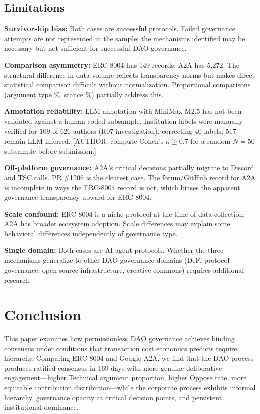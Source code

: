 \documentclass[conference]{IEEEtran}
\begin{document}
\subsection{Limitations}

\textbf{Survivorship bias:} Both cases are successful protocols. Failed
governance attempts are not represented in the sample; the mechanisms
identified may be necessary but not sufficient for successful DAO governance.

\textbf{Comparison asymmetry:} ERC-8004 has 149 records; A2A has 5,272.
The structural difference in data volume reflects transparency norms but
makes direct statistical comparison difficult without normalization.
Proportional comparisons (argument type \%, stance \%) partially address this.

\textbf{Annotation reliability:} LLM annotation with MiniMax-M2.5 has not
been validated against a human-coded subsample. Institution labels were manually
verified for 109 of 626 authors (R07 investigation), correcting 40 labels;
517 remain LLM-inferred. [AUTHOR:
compute Cohen's $\kappa \geq 0.7$ for a random $N=50$ subsample before submission.]

\textbf{Off-platform governance:} A2A's critical decisions partially migrate
to Discord and TSC calls. PR \#1206 is the clearest case. The forum/GitHub
record for A2A is incomplete in ways the ERC-8004 record is not, which
biases the apparent governance transparency upward for ERC-8004.

\textbf{Scale confound:} ERC-8004 is a niche protocol at the time of
data collection; A2A has broader ecosystem adoption. Scale differences
may explain some behavioral differences independently of governance type.

\textbf{Single domain:} Both cases are AI agent protocols. Whether the
three mechanisms generalize to other DAO governance domains (DeFi protocol
governance, open-source infrastructure, creative commons) requires additional
research.


\section{Conclusion}

This paper examines how permissionless DAO governance achieves binding
consensus under conditions that transaction cost economics predicts require
hierarchy. Comparing ERC-8004 and Google A2A, we find that the DAO process
produces ratified consensus in 169 days with more genuine deliberative
engagement---higher Technical argument proportion, higher Oppose rate, more
equitable contribution distribution---while the corporate process exhibits
informal hierarchy, governance opacity at critical decision points, and
persistent institutional dominance.
\end{document}
